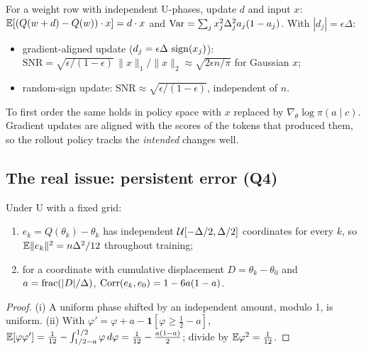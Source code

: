\documentclass[11pt]{article}
\begin{document}
\begin{proposition}\label{prop:layer}
For a weight row with independent U-phases, update $d$ and input $x$: $\mathbb{E}[(Q(w+d)-Q(w))\cdot x]=d\cdot x$ and $\operatorname{Var}=\sum_jx_j^2\Delta_j^2a_j(1-a_j)$. With $|d_j|=\epsilon\Delta$:
\begin{itemize}
\item gradient-aligned update ($d_j=\epsilon\Delta\,\operatorname{sign}(x_j)$): $\mathrm{SNR}=\sqrt{\epsilon/(1-\epsilon)}\,\|x\|_1/\|x\|_2\approx\sqrt{2\epsilon n/\pi}$ for Gaussian $x$;
\item random-sign update: $\mathrm{SNR}\approx\sqrt{\epsilon/(1-\epsilon)}$, independent of $n$.
\end{itemize}
\end{proposition}
To first order the same holds in policy space with $x$ replaced by $\nabla_\theta\log\pi(a\mid c)$. Gradient updates are aligned with the scores of the tokens that produced them, so the rollout policy tracks the \emph{intended} changes well.

\subsection{The real issue: persistent error (Q4)}\label{sec:persistence}

\begin{proposition}\label{prop:persistence}
Under U with a fixed grid:
\begin{enumerate}[label=(\roman*)]
\item $e_k=Q(\theta_k)-\theta_k$ has independent $\mathcal{U}[-\Delta/2,\Delta/2]$ coordinates for every $k$, so $\mathbb{E}\|e_k\|^2=n\Delta^2/12$ throughout training;
\item for a coordinate with cumulative displacement $D=\theta_k-\theta_0$ and $a=\operatorname{frac}(|D|/\Delta)$, $\operatorname{Corr}(e_k,e_0)=1-6a(1-a)$.
\end{enumerate}
\end{proposition}
\begin{proof}
(i) A uniform phase shifted by an independent amount, modulo 1, is uniform. (ii) With $\varphi'=\varphi+a-\mathbf 1[\varphi\ge\tfrac12-a]$, $\mathbb{E}[\varphi\varphi']=\tfrac1{12}-\int_{1/2-a}^{1/2}\varphi\,d\varphi=\tfrac1{12}-\tfrac{a(1-a)}2$; divide by $\mathbb{E}\varphi^2=\tfrac1{12}$.
\end{proof}
\end{document}
